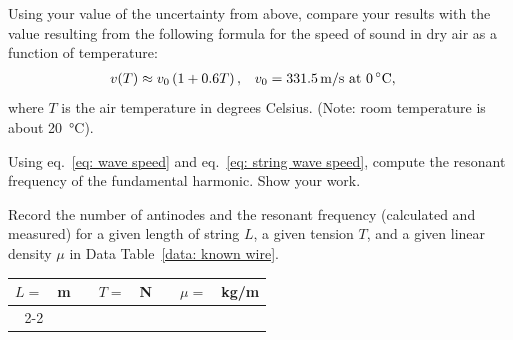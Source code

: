 \documentclass[addpoints]{physlabs}
\begin{document}
\begin{postlab}

    \filbreak
    \question[1] Using your value of the uncertainty from above, compare your results with the value resulting from the following formula for the speed of sound in dry air as a function of temperature:
    \begin{align*}
        v(T) &\approx v_0\left(1 + 0.6T\right), & v_0 &= \qty{331.5}{\meter/\second} \text{ at \qty{0}{\celsius}},
    \end{align*}
    where $T$ is the air temperature in degrees Celsius. (Note: room temperature is about \qty{20}{\celsius}).
    \begin{solution}[4cm]
    \end{solution}




    \filbreak
    \question[1] Using eq.~\ref{eq: wave speed} and eq.~\ref{eq: string wave speed}, compute the resonant frequency of the fundamental harmonic. Show your work.
    \begin{solution}[3cm]
    \end{solution}

    \filbreak
    \question[1] Record the number of antinodes and the resonant frequency (calculated and measured) for a given length of string $L$, a given tension $T$, and a given linear density $\mu$ in Data Table~\ref{data: known wire}.\\

    \begin{center}
        \begin{tabular}{r>{\raggedleft\arraybackslash}p{3cm}p{7mm}r>{\raggedleft\arraybackslash}p{3cm}p{7mm}r>{\raggedleft\arraybackslash}p{3cm}}
            $L=$ & m & & $T=$ & N & & $\mu=$ & kg/m
            \\
            \cline{2-2}\cline{5-5}\cline{8-8}
        \end{tabular}
    \end{center}


\end{postlab}
\end{document}
